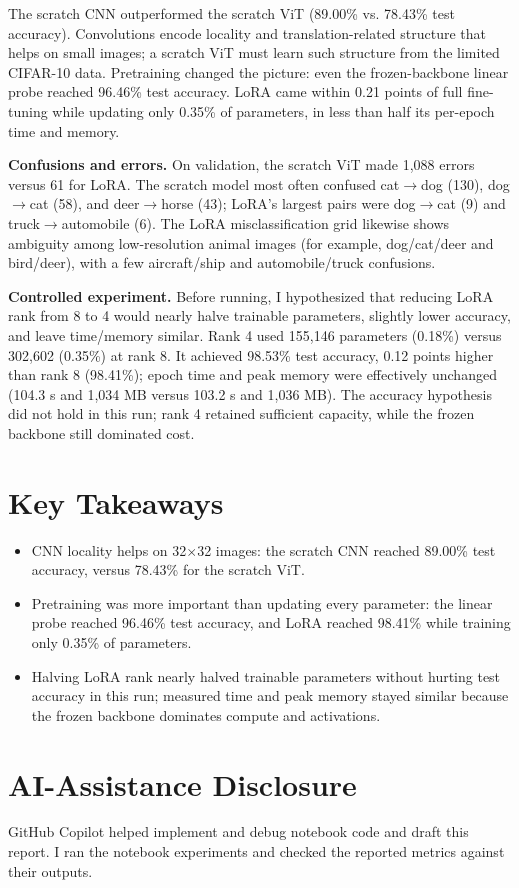 \documentclass[11pt]{article}
\begin{document}
The scratch CNN outperformed the scratch ViT (89.00\% vs. 78.43\% test accuracy). Convolutions encode locality and translation-related structure that helps on small images; a scratch ViT must learn such structure from the limited CIFAR-10 data. Pretraining changed the picture: even the frozen-backbone linear probe reached 96.46\% test accuracy. LoRA came within 0.21 points of full fine-tuning while updating only 0.35\% of parameters, in less than half its per-epoch time and memory.

\textbf{Confusions and errors.} On validation, the scratch ViT made 1,088 errors versus 61 for LoRA. The scratch model most often confused cat$\to$dog (130), dog$\to$cat (58), and deer$\to$horse (43); LoRA's largest pairs were dog$\to$cat (9) and truck$\to$automobile (6). The LoRA misclassification grid likewise shows ambiguity among low-resolution animal images (for example, dog/cat/deer and bird/deer), with a few aircraft/ship and automobile/truck confusions.

\textbf{Controlled experiment.} Before running, I hypothesized that reducing LoRA rank from 8 to 4 would nearly halve trainable parameters, slightly lower accuracy, and leave time/memory similar. Rank 4 used 155,146 parameters (0.18\%) versus 302,602 (0.35\%) at rank 8. It achieved 98.53\% test accuracy, 0.12 points higher than rank 8 (98.41\%); epoch time and peak memory were effectively unchanged (104.3 s and 1,034 MB versus 103.2 s and 1,036 MB). The accuracy hypothesis did not hold in this run; rank 4 retained sufficient capacity, while the frozen backbone still dominated cost.

\section{Key Takeaways}
\begin{itemize}
\item CNN locality helps on 32$\times$32 images: the scratch CNN reached 89.00\% test accuracy, versus 78.43\% for the scratch ViT.
\item Pretraining was more important than updating every parameter: the linear probe reached 96.46\% test accuracy, and LoRA reached 98.41\% while training only 0.35\% of parameters.
\item Halving LoRA rank nearly halved trainable parameters without hurting test accuracy in this run; measured time and peak memory stayed similar because the frozen backbone dominates compute and activations.
\end{itemize}

\section{AI-Assistance Disclosure}
GitHub Copilot helped implement and debug notebook code and draft this report. I ran the notebook experiments and checked the reported metrics against their outputs.
\end{document}

